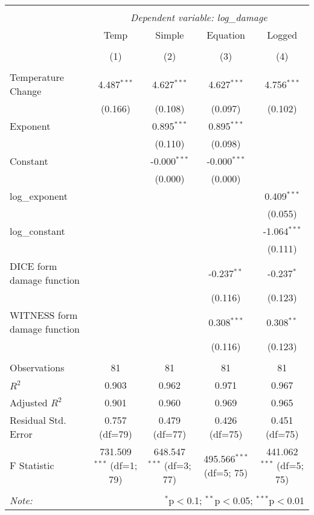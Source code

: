 \begin{table}[!htbp] \centering
\begin{tabular}{@{\extracolsep{5pt}}lcccc}
\\[-1.8ex]\hline
\hline \\[-1.8ex]
& \multicolumn{4}{c}{\textit{Dependent variable: log\_damage}} \
\cr \cline{2-5}
\\[-1.8ex] & \multicolumn{1}{c}{Temp} & \multicolumn{1}{c}{Simple} & \multicolumn{1}{c}{Equation} & \multicolumn{1}{c}{Logged}  \\
\\[-1.8ex] & (1) & (2) & (3) & (4) \\
\hline \\[-1.8ex]
 Temperature Change & 4.487$^{***}$ & 4.627$^{***}$ & 4.627$^{***}$ & 4.756$^{***}$ \\
& (0.166) & (0.108) & (0.097) & (0.102) \\[2em]
 Exponent & & 0.895$^{***}$ & 0.895$^{***}$ & \\
& & (0.110) & (0.098) & \\[2em]
 Constant & & -0.000$^{***}$ & -0.000$^{***}$ & \\
& & (0.000) & (0.000) & \\[2em]
 log\_exponent & & & & 0.409$^{***}$ \\
& & & & (0.055) \\[2em]
 log\_constant & & & & -1.064$^{***}$ \\
& & & & (0.111) \\[2em]
 DICE form damage function & & & -0.237$^{**}$ & -0.237$^{*}$ \\
& & & (0.116) & (0.123) \\[2em]
 WITNESS form damage function & & & 0.308$^{***}$ & 0.308$^{**}$ \\
& & & (0.116) & (0.123) \\[2em]
\hline \\[-1.8ex]
 Observations & 81 & 81 & 81 & 81 \\
 $R^2$ & 0.903 & 0.962 & 0.971 & 0.967 \\
 Adjusted $R^2$ & 0.901 & 0.960 & 0.969 & 0.965 \\
 Residual Std. Error & 0.757 (df=79) & 0.479 (df=77) & 0.426 (df=75) & 0.451 (df=75) \\
 F Statistic & 731.509$^{***}$ (df=1; 79) & 648.547$^{***}$ (df=3; 77) & 495.566$^{***}$ (df=5; 75) & 441.062$^{***}$ (df=5; 75) \\
\hline
\hline \\[-1.8ex]
\textit{Note:} & \multicolumn{4}{r}{$^{*}$p$<$0.1; $^{**}$p$<$0.05; $^{***}$p$<$0.01} \\
\end{tabular}
\end{table}